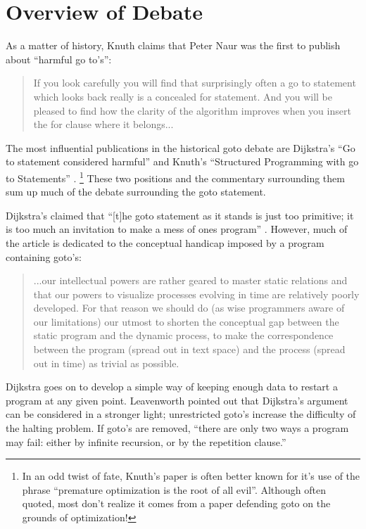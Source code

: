 \documentclass[letterpaper,10pt,twocolumn]{article}
\begin{document}
\section{Overview of Debate}

As a matter of history, Knuth claims \cite{knuth} that Peter Naur was the
first to publish about ``harmful go to's'':

\begin{quote}
If you look carefully you will find that surprisingly often a go to statement
which looks back really is a concealed for statement.  And you will be pleased
to find how the clarity of the algorithm improves when you insert the for clause
where it belongs...
\cite{naur}
\end{quote}

The most influential publications in the historical goto debate are Dijkstra's
``Go to statement considered harmful'' \cite{dijkstra} and Knuth's ``Structured
Programming with go to Statements'' \cite{knuth}. \footnote{In an odd twist
of fate, Knuth's paper is often better known for it's use of the phrase
``premature optimization is the root of all evil''.  Although often quoted,
most don't realize it comes from a paper defending goto on the grounds of
optimization!}  These two positions and the commentary surrounding them sum up
much of the debate surrounding the goto statement.

Dijkstra's claimed that ``[t]he goto statement as it stands is just too primitive;
it is too much an invitation to make a mess of ones program'' \cite{dijkstra}.
However, much of the article is dedicated to the conceptual handicap imposed
by a program containing goto's:

\begin{quote}
...our intellectual powers are rather geared to master static relations and that
our powers to visualize processes evolving in time are relatively poorly developed.
For that reason we should do (as wise programmers aware of our limitations) our
utmost to shorten the conceptual gap between the static program and the dynamic
process, to make the correspondence between the program (spread out in text space)
and the process (spread out in time) as trivial as possible.
\cite{dijkstra}
\end{quote}

Dijkstra goes on to develop a simple way of keeping enough data to restart a
program at any given point.  Leavenworth pointed out that Dijkstra's argument
can be considered in a stronger light; unrestricted goto's increase the
difficulty of the halting problem.  If goto's are removed, ``there are only
two ways a program may fail: either by infinite recursion, or by the repetition
clause.'' \cite{leavenworth}
\end{document}

